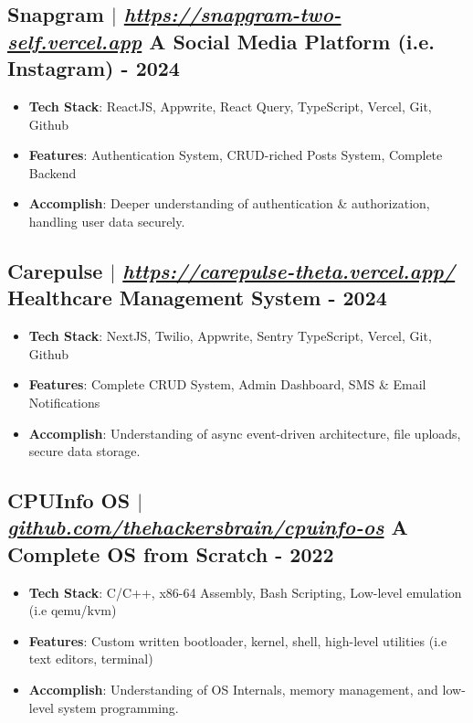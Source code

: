 \documentclass[11pt]{article}
\begin{document}
\subsection{Snapgram $|$ \normalfont\textit{\href{https://snapgram-two-self.vercel.app}{https://snapgram-two-self.vercel.app}} \hfill A Social Media Platform (i.e. Instagram) - \textbf{2024}}
\vspace{3pt}
\begin{itemize}
  \item \textbf{Tech Stack}: ReactJS, Appwrite, React Query, TypeScript, Vercel, Git, Github
  \item \textbf{Features}: Authentication System, CRUD-riched Posts System, Complete Backend
  \item \textbf{Accomplish}: Deeper understanding of authentication \& authorization, handling user data securely.
\end{itemize}

\subsection{Carepulse $|$ \normalfont\textit{\href{https://carepulse-theta.vercel.app/}{https://carepulse-theta.vercel.app/}} \hfill Healthcare Management System - \textbf{2024}}
\vspace{3pt}
\begin{itemize}
  \item \textbf{Tech Stack}: NextJS, Twilio, Appwrite, Sentry TypeScript, Vercel, Git, Github
  \item \textbf{Features}: Complete CRUD System, Admin Dashboard, SMS \& Email Notifications
  \item \textbf{Accomplish}: Understanding of async event-driven architecture, file uploads, secure data storage.
\end{itemize}

\subsection{CPUInfo OS $|$ \normalfont\textit{\href{https://github.com/thehackersbrain/cpuinfo-os}{github.com/thehackersbrain/cpuinfo-os}} \hfill A Complete OS from Scratch - \textbf{2022}}
\vspace{3pt}
\begin{itemize}
  \item \textbf{Tech Stack}: C/C++, x86-64 Assembly, Bash Scripting, Low-level emulation (i.e qemu/kvm)
  \item \textbf{Features}: Custom written bootloader, kernel, shell, high-level utilities (i.e text editors, terminal)
  \item \textbf{Accomplish}: Understanding of OS Internals, memory management, and low-level system programming.
\end{itemize}
\end{document}

